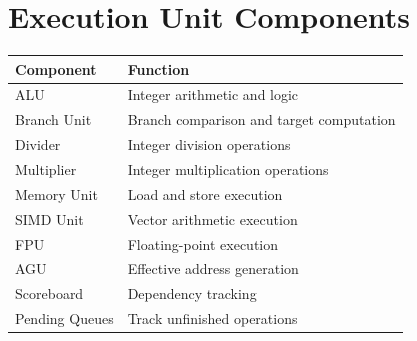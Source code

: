 \chapter{Execution Unit Components}

\begin{center}
\renewcommand{\arraystretch}{1.3}
\begin{tabular}{@{}ll@{}}
\toprule
\textbf{Component} & \textbf{Function} \\
\midrule
ALU & Integer arithmetic and logic \\
Branch Unit & Branch comparison and target computation \\
Divider & Integer division operations \\
Multiplier & Integer multiplication operations \\
Memory Unit & Load and store execution \\
SIMD Unit & Vector arithmetic execution \\
FPU & Floating-point execution \\
AGU & Effective address generation \\
Scoreboard & Dependency tracking \\
Pending Queues & Track unfinished operations \\
\bottomrule
\end{tabular}
\end{center}
